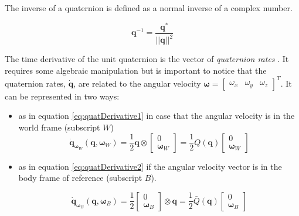 \noindent The inverse of a quaternion is defined as a normal inverse of a complex number.

\begin{equation}
	\mathbf{q}^{-1} = \frac{\mathbf{q}^*}{||\mathbf{q}||^2}
	\label{eq:quatInverse}
\end{equation}

\noindent The time derivative of the unit quaternion is the vector of \textit{quaternion rates} \cite{quaternion2}. It requires some algebraic manipulation but is important to notice that the quaternion rates, $\dot{\mathbf{q}}$, are related to the angular velocity $\boldsymbol{\omega} = \begin{bmatrix} \omega_x & \omega_y & \omega_z \end{bmatrix}^T$. It can be represented in two ways:

\begin{itemize}
		
	\item as in equation \eqref{eq:quatDerivative1} in case that the angular velocity is in the world frame (subscript $W$)
	\begin{equation}
		\dot{\mathbf{q}}_{\boldsymbol{\omega}_W}(\mathbf{q}, \boldsymbol{\omega}_W) = \frac{1}{2}\mathbf{q}\otimes
		\begin{bmatrix}
			0 \\
			\boldsymbol{\omega}_W
		\end{bmatrix}
		= \frac{1}{2}Q(\mathbf{q})
		\begin{bmatrix}
			0 \\
			\boldsymbol{\omega}_W
		\end{bmatrix}
		\label{eq:quatDerivative1}
	\end{equation}

	\item as in equation \eqref{eq:quatDerivative2} if the angular velocity vector is in the body frame of reference (subscript $B$).

	\begin{equation}
		\dot{\mathbf{q}}_{\boldsymbol{\omega}_B}(\mathbf{q}, \boldsymbol{\omega}_B) = \frac{1}{2}
		\begin{bmatrix}
			0 \\
			\boldsymbol{\omega}_B
		\end{bmatrix}
		\otimes \mathbf{q} = \frac{1}{2}\bar{Q}(\mathbf{q})
		\begin{bmatrix}
			0 \\
			\boldsymbol{\omega}_B
		\end{bmatrix}
		\label{eq:quatDerivative2}
	\end{equation}
\end{itemize}

